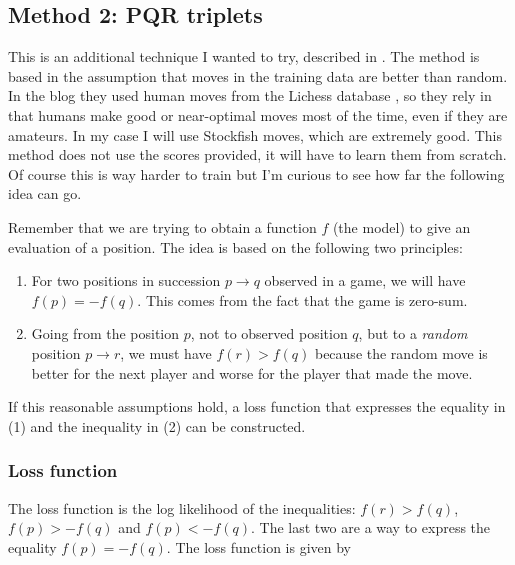 \subsection{Method 2: PQR triplets}

This is an additional technique I wanted to try, described in \cite{dlchess:2014}. The method is based in the assumption that moves in the training data are better than random. In the blog they used human moves from the Lichess database \cite{lichessdb}, so they rely in that humans make good or near-optimal moves most of the time, even if they are amateurs. In my case I will use Stockfish moves, which are extremely good. This method does not use the scores provided, it will have to learn them from scratch. Of course this is way harder to train but I'm curious to see how far the following idea can go.

Remember that we are trying to obtain a function $f$ (the model) to give an evaluation of a position. The idea is based on the following two principles:

\begin{enumerate}
\item For two positions in succession $p \rightarrow q$ observed in a game, we will have $f(p)=-f(q)$. This comes from the fact that the game is zero-sum.
\item Going from the position $p$, not to observed position $q$, but to a \textit{random} position $p \rightarrow r$, we must have $f(r) > f(q)$ because the random move is better for the next player and worse for the player that made the move.
\end{enumerate}

If this reasonable assumptions hold, a loss function that expresses the equality in (1) and the inequality in (2) can be constructed.


\subsubsection{Loss function}

The loss function is the log likelihood of the inequalities: $f(r) > f(q)$, $f(p) > - f(q)$ and $f(p) < -f(q)$. The last two are a way to express the equality $f(p)=-f(q)$. The loss function is given by

